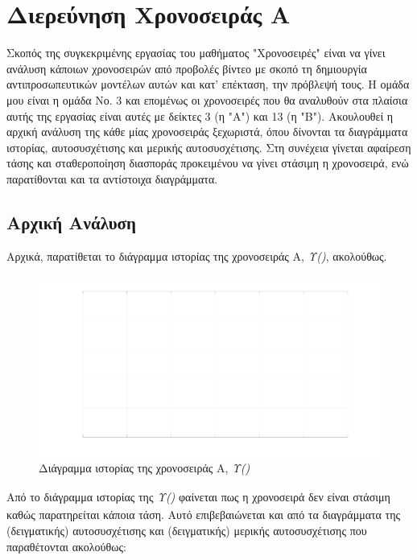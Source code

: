 \chapter{Διερεύνηση Χρονοσειράς Α}
\label{ch:step1}
\setcounter{page}{1}
\thispagestyle{fancy}

Σκοπός της συγκεκριμένης εργασίας του μαθήματος "Χρονοσειρές" είναι να γίνει ανάλυση κάποιων χρονοσειρών από προβολές βίντεο με σκοπό τη δημιουργία αντιπροσωπευτικών μοντέλων αυτών και κατ' επέκταση, την πρόβλεψή τους. Η ομάδα μου είναι η ομάδα Νο. 3 και επομένως οι χρονοσειρές που θα αναλυθούν στα πλαίσια αυτής της εργασίας είναι αυτές με δείκτες 3 (η "Α") και 13 (η "Β"). Ακουλουθεί η αρχική ανάλυση της κάθε μίας χρονοσειράς ξεχωριστά, όπου δίνονται τα διαγράμματα ιστορίας, αυτοσυσχέτισης και μερικής αυτοσυσχέτισης. Στη συνέχεια γίνεται αφαίρεση τάσης και σταθεροποίηση διασποράς προκειμένου να γίνει στάσιμη η χρονοσειρά, ενώ παρατίθονται και τα αντίστοιχα διαγράμματα.  

\section{Αρχική Ανάλυση}

Αρχικά, παρατίθεται το διάγραμμα ιστορίας της χρονοσειράς Α, \emph{Υ\textsubscript{}()}, ακολούθως.

\begin{figure}[H]
    \begin{center}
        \includegraphics[width=\textwidth]{plots/ya_history.svg.pdf}
        \caption{Διάγραμμα ιστορίας της χρονοσειράς Α, \emph{Υ\textsubscript{}()}}
        \label{fig:ya_history}
    \end{center}
\end{figure}

Από το διάγραμμα ιστορίας της \emph{Υ\textsubscript{}()} φαίνεται πως η χρονοσειρά δεν είναι στάσιμη καθώς παρατηρείται κάποια τάση. Αυτό επιβεβαιώνεται και από τα διαγράμματα της (δειγματικής) αυτοσυσχέτισης και (δειγματικής) μερικής αυτοσυσχέτισης που παραθέτονται ακολούθως:

